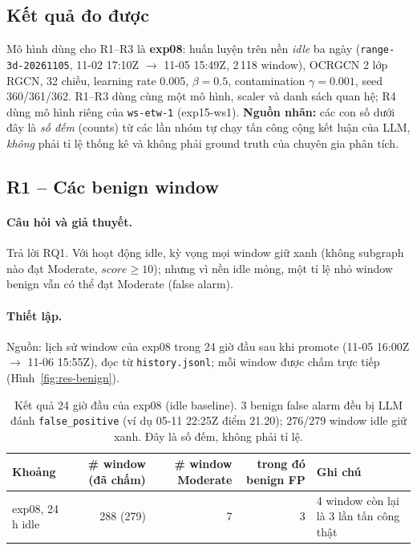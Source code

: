 \subsection*{Kết quả đo được}
Mô hình dùng cho R1--R3 là \textbf{exp08}: huấn luyện trên nền \emph{idle} ba ngày (\texttt{range-3d-20261105}, 11-02 17:10Z $\rightarrow$ 11-05 15:49Z, 2\,118 window), OCRGCN 2 lớp RGCN, 32 chiều, learning rate 0.005, $\beta = 0.5$, contamination $\gamma = 0.001$, seed 360/361/362. R1--R3 dùng cùng một mô hình, scaler và danh sách quan hệ; R4 dùng mô hình riêng của \texttt{ws-etw-1} (exp15-ws1). \textbf{Nguồn nhãn:} các con số dưới đây là \emph{số đếm} (counts) từ các lần nhóm tự chạy tấn công cộng kết luận của LLM, \emph{không} phải tỉ lệ thống kê và không phải ground truth của chuyên gia phân tích.

\subsection{R1 -- Các benign window}
\label{sec:res-benign}

\paragraph{Câu hỏi và giả thuyết.}
Trả lời RQ1. Với hoạt động idle, kỳ vọng mọi window giữ xanh (không subgraph nào đạt Moderate, $score \ge 10$); nhưng vì nền idle mỏng, một tỉ lệ nhỏ window benign vẫn có thể đạt Moderate (false alarm).

\paragraph{Thiết lập.}
Nguồn: lịch sử window của exp08 trong 24 giờ đầu sau khi promote (11-05 16:00Z $\rightarrow$ 11-06 15:55Z), đọc từ \texttt{history.jsonl}; mỗi window được chấm trực tiếp (Hình~\ref{fig:res-benign}).

\begin{table}[H]
\centering
\small
\begin{tabular}{l r r r l}
\toprule
\textbf{Khoảng} & \textbf{\# window (đã chấm)} & \textbf{\# window Moderate} & \textbf{trong đó benign FP} & \textbf{Ghi chú} \\
\midrule
exp08, 24 h idle & 288 (279) & 7 & 3 & 4 window còn lại là 3 lần tấn công thật \\
\bottomrule
\end{tabular}
\caption{Kết quả 24 giờ đầu của exp08 (idle baseline). 3 benign false alarm đều bị LLM đánh \texttt{false\_positive} (ví dụ 05-11 22:25Z điểm 21.20); 276/279 window idle giữ xanh. Đây là số đếm, không phải tỉ lệ.}
\label{tab:res-benign}
\end{table}

